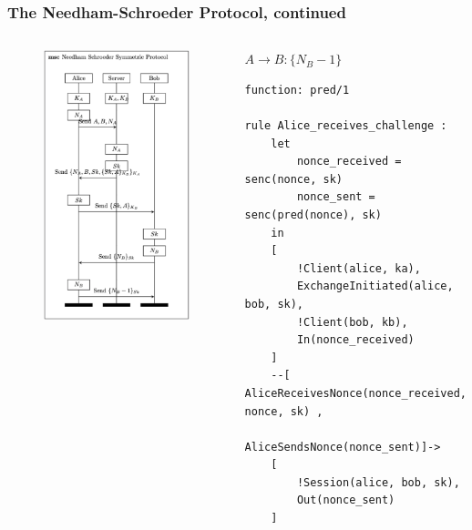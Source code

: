 \documentclass[aspectratio=169,t,xcolor=table]{beamer}
\begin{document}
\begin{frame}[fragile]
    \frametitle{The Needham-Schroeder Protocol, continued}
    \begin{columns}
        \begin{figure}
            \centering
            \includegraphics[width=.8\textwidth]{images/NS.png}
        \end{figure}
        \begin{block}{$A \to B: \{N_B - 1\}$}
            \begin{lstlisting}[language=Tamarin]
function: pred/1
    
rule Alice_receives_challenge :
    let
        nonce_received = senc(nonce, sk)
        nonce_sent = senc(pred(nonce), sk)
    in
    [
        !Client(alice, ka),
        ExchangeInitiated(alice, bob, sk),
        !Client(bob, kb),
        In(nonce_received)
    ]
    --[ AliceReceivesNonce(nonce_received, nonce, sk) ,
        AliceSendsNonce(nonce_sent)]->
    [
        !Session(alice, bob, sk),
        Out(nonce_sent)
    ]\end{lstlisting}
        \end{block}
    \end{columns}
\end{frame}
\end{document}
